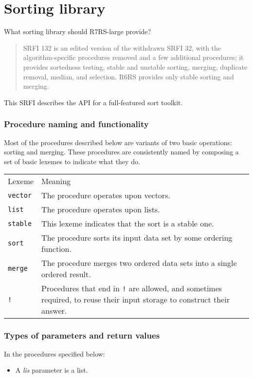 \chapter{Sorting library}
 What sorting library should R7RS-large provide?

\begin{quote}
SRFI 132 is an edited version of the withdrawn SRFI 32, with the
algorithm-specific procedures removed and a few additional procedures;
it provides sortedness testing, stable and unstable sorting, merging,
duplicate removal, median, and selection. R6RS provides only stable
sorting and merging.
\end{quote}

This SRFI describes the API for a full-featured sort toolkit.

\subsection{Procedure naming and
functionality}\label{Procedurenamingandfunctionality}

Most of the procedures described below are variants of two basic
operations: sorting and merging. These procedures are consistently named
by composing a set of basic lexemes to indicate what they do.

\begin{tabular}{ll}
Lexeme & Meaning\tabularnewline
\texttt{vector} & The procedure operates upon vectors.\tabularnewline
\texttt{list} & The procedure operates upon lists.\tabularnewline
\texttt{stable} & This lexeme indicates that the sort is a stable
one.\tabularnewline
\texttt{sort} & The procedure sorts its input data set by some ordering
function.\tabularnewline
\texttt{merge} & The procedure merges two ordered data sets into a
single ordered result.\tabularnewline
\texttt{!} & Procedures that end in \texttt{!} are allowed, and
sometimes required, to reuse their input storage to construct their
answer.\tabularnewline
\end{tabular}

\subsection{Types of parameters and return
values}\label{Typesofparametersandreturnvalues}

In the procedures specified below:

\begin{itemize}
\tightlist
\item
  A \emph{lis} parameter is a list.
\end{itemize}

